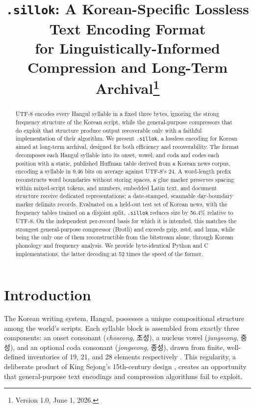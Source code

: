 \documentclass[conference]{IEEEtran}
\title{\texttt{.sillok}: A Korean-Specific Lossless Text Encoding Format\\for Linguistically-Informed Compression and Long-Term Archival\thanks{Version 1.0, June 1, 2026.}}
\author{\IEEEauthorblockN{Jewoo Suh}%
\IEEEauthorblockA{Independent Researcher\\jewoosuh0111\,[at]\,gmail.com}}
\begin{document}
\maketitle

\begin{abstract}
UTF-8 encodes every Hangul syllable in a fixed three bytes, ignoring the strong
frequency structure of the Korean script, while the general-purpose compressors
that do exploit that structure produce output recoverable only with a faithful
implementation of their algorithm. We present \texttt{.sillok}, a lossless
encoding for Korean aimed at long-term archival, designed for both efficiency
and recoverability. The format decomposes each Hangul syllable into its onset,
vowel, and coda and codes each position with a static, published Huffman table
derived from a Korean news corpus, encoding a syllable in 9.46 bits on average
against UTF-8's 24. A word-length prefix reconstructs word boundaries without
storing spaces, a glue marker preserves spacing within mixed-script tokens, and
numbers, embedded Latin text, and document structure receive dedicated
representations; a date-stamped, scannable day-boundary marker delimits records.
Evaluated on a held-out test set of Korean news, with the frequency tables
trained on a disjoint split, \texttt{.sillok} reduces size by 56.4\% relative to
UTF-8. On the independent per-record basis for which it is intended, this matches
the strongest general-purpose compressor (Brotli) and exceeds gzip, zstd, and
lzma, while being the only one of them reconstructible from the bitstream alone,
through Korean phonology and frequency analysis. We provide byte-identical Python
and C implementations, the latter decoding at 52 times the speed of the former.
\end{abstract}

\section{Introduction}

The Korean writing system, Hangul, possesses a unique compositional structure among the world's scripts. Each syllable block is assembled from exactly three components: an onset consonant (\emph{choseong}, 초성), a nucleus vowel (\emph{jungseong}, 중성), and an optional coda consonant (\emph{jongseong}, 종성), drawn from finite, well-defined inventories of 19, 21, and 28 elements respectively \cite{nikl, unicodehangul}. This regularity, a deliberate product of King Sejong's 15th-century design \cite{hunminjeongeum}, creates an opportunity that general-purpose text encodings and compression algorithms fail to exploit.
\end{document}
